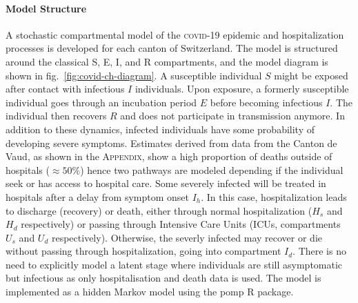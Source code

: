 \paragraph{Model Structure} A stochastic compartmental model of the \textsc{covid}-19 epidemic and hospitalization processes is developed for each canton of Switzerland. The model is structured around the classical S, E, I, and R compartments\cite{Kermack:ContributionMathematicalTheory:1927}, and the model diagram is shown in fig.~\ref{fig:covid-ch-diagram}. %
A susceptible individual $S$ might be exposed after contact with infectious $I$ individuals. Upon exposure, a formerly susceptible individual goes through an incubation period $E$ before becoming infectious $I$. The individual then recovers $R$ and does not participate in transmission anymore. 
In addition to these dynamics, infected individuals have some probability of developing severe symptoms. Estimates derived from data from the Canton de Vaud, as shown in the \textsc{Appendix}, show a high proportion of deaths outside of hospitals ($\approx 50\%$) hence two pathways are modeled depending if the individual seek or has access to hospital care.  Some severely infected will be treated in hospitals after a delay from symptom onset $I_h$. In this case, hospitalization leads to discharge (recovery) or death, either through normal hospitalization ($H_{s}$ and $H_d$ respectively) or passing through Intensive Care Units (ICUs, compartments $U_{s}$ and $U_d$ respectively). Otherwise, the severly infected may recover or die without passing through hospitalization, going into compartment $I_d$. There is no need to explicitly model a latent stage where individuals are still asymptomatic but infectious\cite[-8\baselineskip]{Ganyani:EstimatingGenerationInterval:2020,He:TemporalDynamicsViral:2020, Liu:ContributionPresymptomaticInfection:2020} as only hospitalisation and death data is used. The model is implemented as a hidden Markov model using the pomp R package\cite{King:StatisticalInferencePartially:2015}. 
